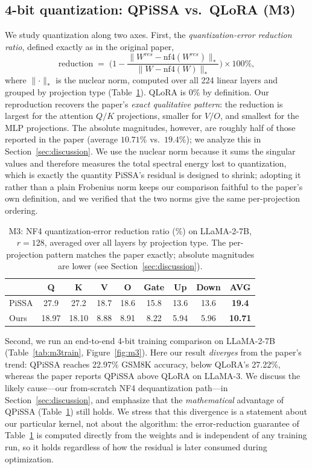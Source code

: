 \documentclass[mlmain]{jmlr}
\begin{document}
\subsection{4-bit quantization: QPiSSA vs.\ QLoRA (M3)}
\label{sec:m3}
We study quantization along two axes. First, the \emph{quantization-error reduction ratio}, defined exactly as in the original paper,
\[
\text{reduction} \;=\; \Big(1 - \frac{\lVert W^{res}-\mathrm{nf4}(W^{res})\rVert_*}{\lVert W-\mathrm{nf4}(W)\rVert_*}\Big)\times 100\%,
\]
where $\lVert\cdot\rVert_*$ is the nuclear norm, computed over all 224 linear layers and grouped by projection type (Table~\ref{tab:m3error}). QLoRA is $0\%$ by definition. Our reproduction recovers the paper's \emph{exact qualitative pattern}: the reduction is largest for the attention $Q/K$ projections, smaller for $V/O$, and smallest for the MLP projections. The absolute magnitudes, however, are roughly half of those reported in the paper (average $10.71\%$ vs.\ $19.4\%$); we analyze this in Section~\ref{sec:discussion}. We use the nuclear norm because it sums the singular values and therefore measures the total spectral energy lost to quantization, which is exactly the quantity PiSSA's residual is designed to shrink; adopting it rather than a plain Frobenius norm keeps our comparison faithful to the paper's own definition, and we verified that the two norms give the same per-projection ordering.

\begin{table}[H]
\centering
\caption{\footnotesize M3: NF4 quantization-error reduction ratio (\%) on LLaMA-2-7B, $r{=}128$, averaged over all layers by projection type. The per-projection pattern matches the paper exactly; absolute magnitudes are lower (see Section~\ref{sec:discussion}).}
\label{tab:m3error}
\begin{tabular}{lcccccccc}
\toprule
 & Q & K & V & O & Gate & Up & Down & \textbf{AVG} \\
\midrule
PiSSA \citep{meng2024pissa} & 27.9 & 27.2 & 18.7 & 18.6 & 15.8 & 13.6 & 13.6 & \textbf{19.4} \\
Ours & 18.97 & 18.10 & 8.88 & 8.91 & 8.22 & 5.94 & 5.96 & \textbf{10.71} \\
\bottomrule
\end{tabular}
\end{table}

Second, we run an end-to-end 4-bit training comparison on LLaMA-2-7B (Table~\ref{tab:m3train}, Figure~\ref{fig:m3}). Here our result \emph{diverges} from the paper's trend: QPiSSA reaches 22.97\% GSM8K accuracy, below QLoRA's 27.22\%, whereas the paper reports QPiSSA above QLoRA on LLaMA-3. We discuss the likely cause---our from-scratch NF4 dequantization path---in Section~\ref{sec:discussion}, and emphasize that the \emph{mathematical} advantage of QPiSSA (Table~\ref{tab:m3error}) still holds. We stress that this divergence is a statement about our particular kernel, not about the algorithm: the error-reduction guarantee of Table~\ref{tab:m3error} is computed directly from the weights and is independent of any training run, so it holds regardless of how the residual is later consumed during optimization.
\end{document}
